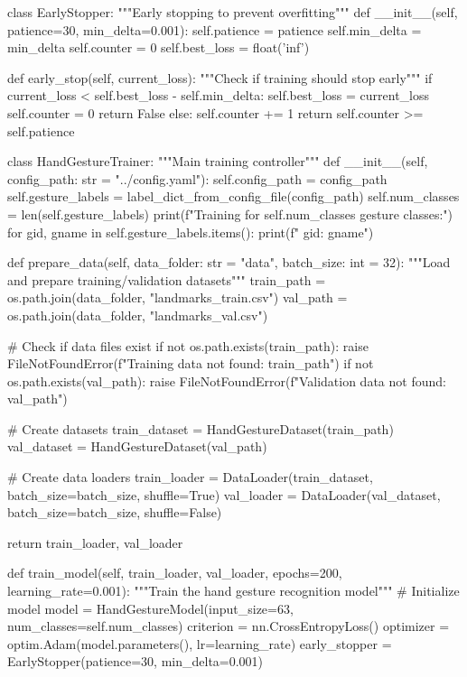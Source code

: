 \begin{aivncodebox}
\begin{python}
class EarlyStopper:
    """Early stopping to prevent overfitting"""
    def __init__(self, patience=30, min_delta=0.001):
        self.patience = patience
        self.min_delta = min_delta
        self.counter = 0
        self.best_loss = float('inf')
    
    def early_stop(self, current_loss):
        """Check if training should stop early"""
        if current_loss < self.best_loss - self.min_delta:
            self.best_loss = current_loss
            self.counter = 0
            return False
        else:
            self.counter += 1
            return self.counter >= self.patience

class HandGestureTrainer:
    """Main training controller"""
    def __init__(self, config_path: str = "../config.yaml"):
        self.config_path = config_path
        self.gesture_labels = label_dict_from_config_file(config_path)
        self.num_classes = len(self.gesture_labels)
        print(f"Training for {self.num_classes} gesture classes:")
        for gid, gname in self.gesture_labels.items():
            print(f"  {gid}: {gname}")
    
    def prepare_data(self, data_folder: str = "data", batch_size: int = 32):
        """Load and prepare training/validation datasets"""
        train_path = os.path.join(data_folder, "landmarks_train.csv")
        val_path = os.path.join(data_folder, "landmarks_val.csv")
        
        # Check if data files exist
        if not os.path.exists(train_path):
            raise FileNotFoundError(f"Training data not found: {train_path}")
        if not os.path.exists(val_path):
            raise FileNotFoundError(f"Validation data not found: {val_path}")
        
        # Create datasets
        train_dataset = HandGestureDataset(train_path)
        val_dataset = HandGestureDataset(val_path)
        
        # Create data loaders
        train_loader = DataLoader(train_dataset, batch_size=batch_size, shuffle=True)
        val_loader = DataLoader(val_dataset, batch_size=batch_size, shuffle=False)
        
        return train_loader, val_loader
    
    def train_model(self, train_loader, val_loader, epochs=200, learning_rate=0.001):
        """Train the hand gesture recognition model"""
        # Initialize model
        model = HandGestureModel(input_size=63, num_classes=self.num_classes)
        criterion = nn.CrossEntropyLoss()
        optimizer = optim.Adam(model.parameters(), lr=learning_rate)
        early_stopper = EarlyStopper(patience=30, min_delta=0.001)
        

\end{python}
\end{aivncodebox}
